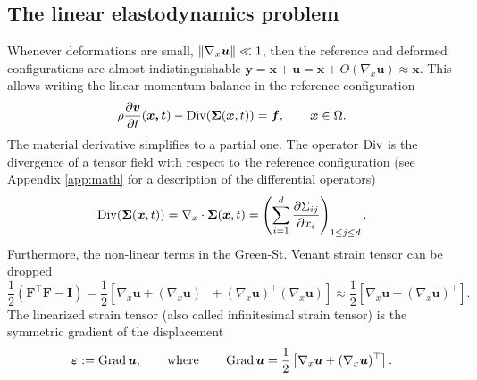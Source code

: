 \subsection{The linear elastodynamics problem}\label{sec:linElas}
Whenever deformations are small, $\left\|\nabla_x\bm{u}\right\| \ll 1$, then the reference and deformed configurations are almost indistinguishable $\bm{y} = \bm{x} + \bm{u} = \bm{x}  + O(\nabla_x\bm{u}) \approx \bm{x}$. This allows writing the linear momentum balance in the reference configuration
\begin{equation*}
	\rho \diffp{\bm{v}}{t}(\bm{x, t}) - \Div(\bm\Sigma(\bm{x}, t)) = \bm{f}, \qquad \bm{x} \in \Omega.
\end{equation*}
The material derivative simplifies to a partial one. The operator $\operatorname*{Div}$ is the divergence of a tensor field with respect to the reference configuration (see Appendix \ref{app:math} for a description of the differential operators)
\begin{equation*}
\Div(\bm\Sigma(\bm{x}, t)) = \nabla_x \cdot \bm\Sigma(\bm{x}, t) = \left(\sum_{i=1}^{d}\diffp{\Sigma_{ij}}{x_i}\right)_{1 \leq j \leq d}.
\end{equation*}
Furthermore, the non-linear terms in the Green-St. Venant strain tensor can be dropped
\begin{equation*}
\frac{1}{2} (\bm{F}^\top \bm{F} - \bm{I}) = \frac{1}{2}\left[\nabla_x \bm{u} + (\nabla_x \bm{u})^\top + (\nabla_x \bm{u})^\top (\nabla_x \bm{u})\right]
\approx \frac{1}{2}\left[\nabla_x \bm{u} + (\nabla_x \bm{u})^\top\right].
\end{equation*}
The linearized strain tensor (also called infinitesimal strain tensor) is the symmetric gradient of the displacement
\begin{equation}
\bm{\varepsilon} := \operatorname*{Grad}\bm{u}, \qquad \text{where} \qquad \operatorname*{Grad}\bm{u} = \frac{1}{2}\left[\nabla_x \bm{u} + (\nabla_x \bm{u})^\top\right].
\end{equation}

